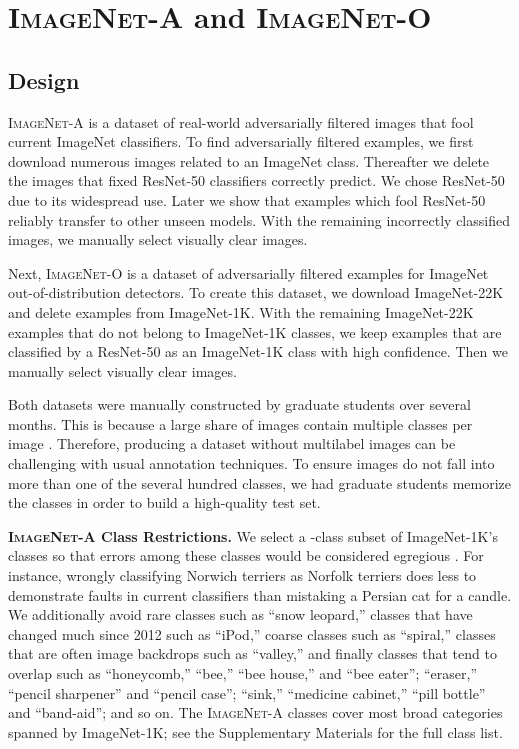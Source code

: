 \documentclass[10pt,twocolumn,letterpaper]{article}
\begin{document}
\section{\textsc{ImageNet-A} and \textsc{ImageNet-O}}\label{sec:design}
\subsection{Design}
\textsc{ImageNet-A} is a dataset of real-world adversarially filtered images that fool current ImageNet classifiers.
To find adversarially filtered examples, we first download numerous images related to an ImageNet class. Thereafter we delete the images that fixed ResNet-50 \cite{resnet} classifiers correctly predict. We chose ResNet-50 due to its widespread use. Later we show that examples which fool ResNet-50 reliably transfer to other unseen models. With the remaining incorrectly classified images, we manually select visually clear images.

Next, \textsc{ImageNet-O} is a dataset of adversarially filtered examples for ImageNet out-of-distribution detectors. To create this dataset, we download ImageNet-22K and delete examples from ImageNet-1K. With the remaining ImageNet-22K examples that do not belong to ImageNet-1K classes, we keep examples that are classified by a ResNet-50 as an ImageNet-1K class with high confidence. Then we manually select visually clear images.

Both datasets were manually constructed by graduate students over several months. This is because a large share of images contain multiple classes per image \cite{Stock2018ConvNetsAI}. Therefore, producing a dataset without multilabel images can be challenging with usual annotation techniques. To ensure images do not fall into more than one of the several hundred classes, we had graduate students memorize the classes in order to build a high-quality test set.

\noindent\textbf{\textsc{ImageNet-A} Class Restrictions.}\quad 
We select a -class subset of ImageNet-1K's  classes so that errors among these  classes would be considered egregious \cite{imagenet}.
For instance, wrongly classifying Norwich terriers as Norfolk terriers does less to demonstrate faults in current classifiers than mistaking a Persian cat for a candle.
We additionally avoid rare classes such as ``snow leopard,'' classes that have changed much since 2012 such as ``iPod,'' coarse classes such as ``spiral,'' classes that are often image backdrops such as ``valley,'' and finally classes that tend to overlap such as ``honeycomb,'' ``bee,'' ``bee house,'' and ``bee eater''; ``eraser,'' ``pencil sharpener'' and ``pencil case''; ``sink,'' ``medicine cabinet,'' ``pill bottle'' and ``band-aid''; and so on. The  \textsc{ImageNet-A} classes cover most broad categories spanned by ImageNet-1K; see the Supplementary Materials  for the full class list.
\end{document}
